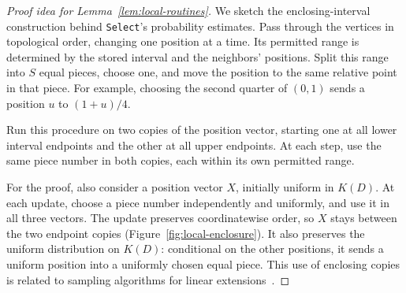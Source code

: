\begin{proof}[Proof idea for Lemma~\ref{lem:local-routines}]
We sketch the enclosing-interval construction behind \texttt{Select}'s
probability estimates. Pass through the vertices in topological order,
changing one position at a time. Its permitted range is determined by
the stored interval and the neighbors' positions. Split this range into
$S$ equal pieces, choose one, and move the position to the same relative
point in that piece.
For example, choosing the second quarter of $(0,1)$ sends a position
$u$ to $(1+u)/4$.

Run this procedure on two copies of the position vector, starting one
at all lower interval endpoints and the other at all upper endpoints.
At each step, use the same piece number in both copies, each within its
own permitted range.

For the proof, also consider a position vector $X$, initially uniform
in $K(D)$. At each update, choose a piece number
independently and uniformly, and use it in all three vectors.
The update preserves coordinatewise order, so $X$ stays between the two
endpoint copies (Figure~\ref{fig:local-enclosure}). It also preserves
the uniform distribution on $K(D)$: conditional on the other positions,
it sends a uniform position into a uniformly chosen equal piece.
This use of enclosing copies is related to sampling algorithms for
linear extensions~\cite[Section~4.2]{talvitie-counting}.


\end{proof}
